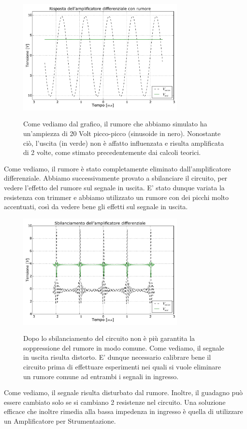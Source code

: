 \begin{figure}[ht]
 \centering
   {\includegraphics[width=0.75\textwidth]{../E05/latex/amp_diff.pdf}}
 \caption{Come vediamo dal grafico, il rumore che abbiamo simulato ha un'ampiezza di 20 Volt picco-picco (sinusoide in nero). Nonostante ciò, l'uscita (in verde) non è affatto influenzata e risulta amplificata di 2 volte, come stimato precedentemente dai calcoli teorici. }
 \label{gr5:amp_diff}
\end{figure}

Come vediamo, il rumore è stato completamente eliminato dall'amplificatore differenziale. Abbiamo successivamente provato a sbilanciare il circuito, per vedere l'effetto del rumore sul segnale in uscita. E' stato dunque variata la resistenza con trimmer e abbiamo utilizzato un rumore con dei picchi molto accentuati, così da vedere bene gli effetti sul segnale in uscita. 

\begin{figure}[ht]
 \centering
   {\includegraphics[width=0.75\textwidth]{../E05/latex/sbil_amp_diff.pdf}}
 \caption{Dopo lo sbilanciamento del circuito non è più garantita la soppressione del rumore in modo comune. Come vediamo, il segnale in uscita risulta distorto. E' dunque necessario calibrare bene il circuito prima di effettuare esperimenti nei quali si vuole eliminare un rumore comune ad entrambi i segnali in ingresso.}
 \label{gr5:sbil_amp_diff}
\end{figure}

Come vediamo, il segnale risulta disturbato dal rumore. Inoltre, il guadagno può essere cambiato solo se si cambiano 2 resistenze nel circuito. Una soluzione efficace che inoltre rimedia alla bassa impedenza in ingresso è quella di utilizzare un Amplificatore per Strumentazione.
